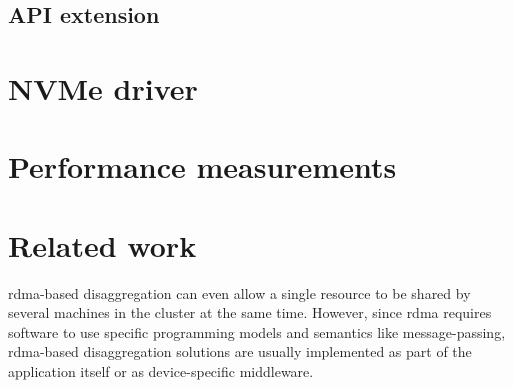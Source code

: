 \subsection{API extension}

\section{NVMe driver}\label{sec:nvme}


\section{Performance measurements}\label{sec:eval}

\section{Related work}\label{sec:rw}
\Gls{rdma}-based \gls{disaggregation} can even allow a single resource to be shared by several machines in the cluster at the same time. 
%
However, since \gls{rdma} requires software to use specific programming models and semantics like message-passing, \gls{rdma}-based \gls{disaggregation} solutions are usually implemented as part of the application itself or as device-specific \gls{middleware}.
%
